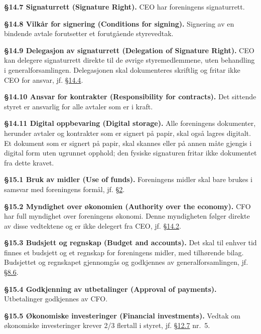 \documentclass{../../../Common/Latex/Templates/rapport}
\begin{document}
\textbf{\S 14.7 Signaturrett (Signature Right).}\label{bylaw:14.7} CEO har foreningens signaturrett.

\textbf{\S 14.8 Vilkår for signering (Conditions for signing).}\label{bylaw:14.8} Signering av en bindende avtale forutsetter et forutgående styrevedtak.

\textbf{\S 14.9 Delegasjon av signaturrett (Delegation of Signature Right).}\label{bylaw:14.9} CEO kan delegere signaturrett direkte til de øvrige styremedlemmene, uten behandling i generalforsamlingen. Delegasjonen skal dokumenteres skriftlig og fritar ikke CEO for ansvar, jf. \hyperref[bylaw:14.4]{\S 14.4}.

\textbf{\S 14.10 Ansvar for kontrakter (Responsibility for contracts).}\label{bylaw:14.10} Det sittende styret er ansvarlig for alle avtaler som er i kraft.

\textbf{\S 14.11 Digital oppbevaring (Digital storage).}\label{bylaw:14.11} Alle foreningens dokumenter, herunder avtaler og kontrakter som er signert på papir, skal også lagres digitalt. Et dokument som er signert på papir, skal skannes eller på annen måte gjengis i digital form uten ugrunnet opphold; den fysiske signaturen fritar ikke dokumentet fra dette kravet.


\label{bylaw:15}
\textbf{\S 15.1 Bruk av midler (Use of funds).}\label{bylaw:15.1} Foreningens midler skal bare brukes i samsvar med foreningens formål, jf. \hyperref[bylaw:2]{\S 2}.

\textbf{\S 15.2 Myndighet over økonomien (Authority over the economy).}\label{bylaw:15.2} CFO har full myndighet over foreningens økonomi. Denne myndigheten følger direkte av disse vedtektene og er ikke delegert fra CEO, jf. \hyperref[bylaw:14.2]{\S 14.2}.

\textbf{\S 15.3 Budsjett og regnskap (Budget and accounts).}\label{bylaw:15.3} Det skal til enhver tid finnes et budsjett og et regnskap for foreningens midler, med tilhørende bilag. Budsjettet og regnskapet gjennomgås og godkjennes av generalforsamlingen, jf. \hyperref[bylaw:8.6]{\S 8.6}.

\textbf{\S 15.4 Godkjenning av utbetalinger (Approval of payments).}\label{bylaw:15.4} Utbetalinger godkjennes av CFO.

\textbf{\S 15.5 Økonomiske investeringer (Financial investments).}\label{bylaw:15.5} Vedtak om økonomiske investeringer krever 2/3 flertall i styret, jf. \hyperref[bylaw:12.7]{\S 12.7} nr.\ 5.
\end{document}
